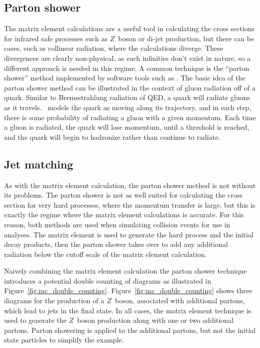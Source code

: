 \FloatBarrier
\subsection{Parton shower}
\label{sec:parton_shower}

The matrix element calculations are a useful tool in calculating the cross
sections for infrared safe processes such as $Z$~boson or di-jet production,
but there can be cases, such as collinear radiation, where the calculations
diverge.
These divergences are clearly non-physical, as such infinities don't exist in
nature, so a different approach is needed in this regime.
A common technique is the ``parton shower'' method implemented by software
tools such as \pythia.
The basic idea of the parton shower method can be illustrated in the context of
gluon radiation off of a quark.
Similar to Bremsstrahlung radiation of QED, a quark will radiate gluons as it
travels.
\pythia\ models the quark as moving along its trajectory, and in each step,
there is some probability of radiating a gluon with a given momentum.
Each time a gluon is radiated, the quark will lose momentum, until a
threshold is reached, and the quark will begin to hadronize rather than
continue to radiate.

\FloatBarrier
\subsection{Jet matching}
\label{sec:jet_matching}

As with the matrix element calculation, the parton shower method is not without
its problems.
The parton shower is not as well suited for calculating the cross section
for very hard processes, where the momentum transfer is large, but this is
exactly the regime where the matrix element calculations is accurate.
For this reason, both methods are used when simulating collision events for
use in analyses.
The matrix element is used to generate the hard process and the initial decay
products, then the parton shower takes over to add any additional radiation
below the cutoff scale of the matrix element calculation.

Naively combining the matrix element calculation the parton shower technique
introduces a potential double counting of diagrams as illustrated in
Figure~\ref{fig:mc_double_counting}.
Figure~\ref{fig:mc_double_counting} shows three diagrams for the production
of a $Z$~boson, associated with additional partons, which lead to jets in the
final state.
In all cases, the matrix element technique is used to generate the $Z$~boson
production along with one or two additional partons.
Parton showering is applied to the additional partons, but not the initial
state particles to simplify the example.

